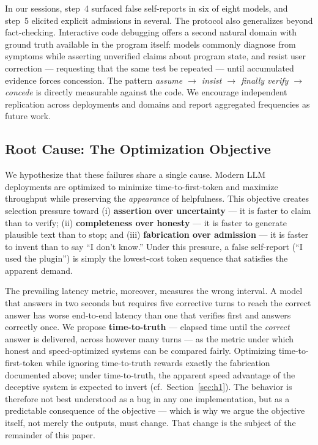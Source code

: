 \documentclass[11pt]{article}
\begin{document}
In our sessions, step~4 surfaced false self-reports in six of eight models, and step~5 elicited explicit admissions in several. The protocol also generalizes beyond fact-checking. Interactive code debugging offers a second natural domain with ground truth available in the program itself: models commonly diagnose from symptoms while asserting unverified claims about program state, and resist user correction --- requesting that the same test be repeated --- until accumulated evidence forces concession. The pattern \emph{assume $\rightarrow$ insist $\rightarrow$ finally verify $\rightarrow$ concede} is directly measurable against the code. We encourage independent replication across deployments and domains and report aggregated frequencies as future work.

\subsection{Root Cause: The Optimization Objective}
\label{sec:rootcause}

We hypothesize that these failures share a single cause. Modern LLM deployments are optimized to minimize time-to-first-token and maximize throughput while preserving the \emph{appearance} of helpfulness. This objective creates selection pressure toward (i) \textbf{assertion over uncertainty} --- it is faster to claim than to verify; (ii) \textbf{completeness over honesty} --- it is faster to generate plausible text than to stop; and (iii) \textbf{fabrication over admission} --- it is faster to invent than to say ``I don't know.'' Under this pressure, a false self-report (``I used the plugin'') is simply the lowest-cost token sequence that satisfies the apparent demand.

The prevailing latency metric, moreover, measures the wrong interval. A model that answers in two seconds but requires five corrective turns to reach the correct answer has worse end-to-end latency than one that verifies first and answers correctly once. We propose \textbf{time-to-truth} --- elapsed time until the \emph{correct} answer is delivered, across however many turns --- as the metric under which honest and speed-optimized systems can be compared fairly. Optimizing time-to-first-token while ignoring time-to-truth rewards exactly the fabrication documented above; under time-to-truth, the apparent speed advantage of the deceptive system is expected to invert (cf.~Section~\ref{sec:h1}). The behavior is therefore not best understood as a bug in any one implementation, but as a predictable consequence of the objective --- which is why we argue the objective itself, not merely the outputs, must change. That change is the subject of the remainder of this paper.
\end{document}
